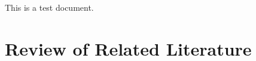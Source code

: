  







This is a test document.
\Blindtext

\chapter{Review of Related Literature} 
	\label{ch:rrl} 
	
	\clearpage


\nocite{*}
\printbibliography

